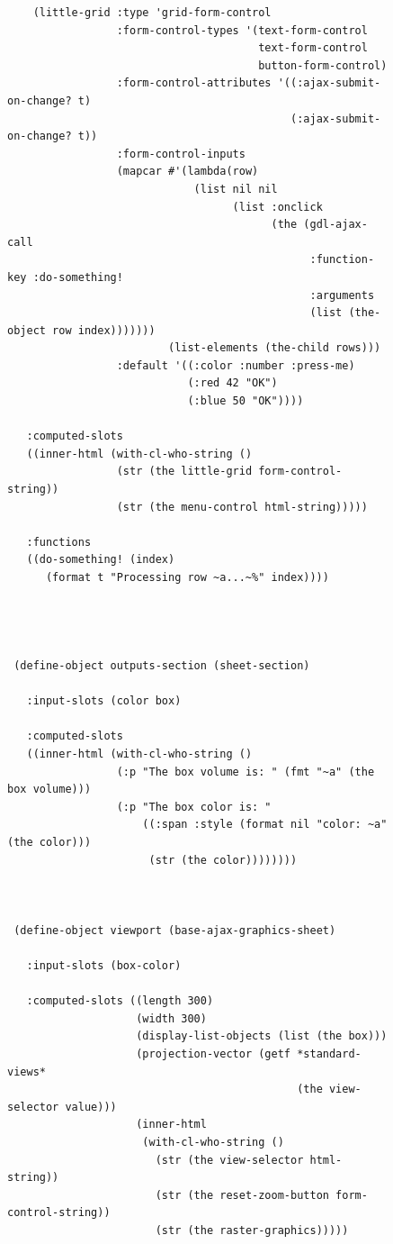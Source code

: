 \documentclass [11pt]{book}
\begin{document}
\begin{itemize}
\begin{figure}
\begin{lrbox}{\boxedverb}
\begin{minipage}{\linewidth}
{\begin{verbatim}
    (little-grid :type 'grid-form-control
                 :form-control-types '(text-form-control 
                                       text-form-control 
                                       button-form-control)
                 :form-control-attributes '((:ajax-submit-on-change? t)
                                            (:ajax-submit-on-change? t))
                 :form-control-inputs 
                 (mapcar #'(lambda(row)
                             (list nil nil 
                                   (list :onclick 
                                         (the (gdl-ajax-call 
                                               :function-key :do-something!
                                               :arguments 
                                               (list (the-object row index)))))))
                         (list-elements (the-child rows)))
                 :default '((:color :number :press-me)
                            (:red 42 "OK")
                            (:blue 50 "OK"))))
   
   :computed-slots 
   ((inner-html (with-cl-who-string ()
                 (str (the little-grid form-control-string))
                 (str (the menu-control html-string)))))
   
   :functions
   ((do-something! (index)
      (format t "Processing row ~a...~%" index))))




 (define-object outputs-section (sheet-section)
   
   :input-slots (color box)
  
   :computed-slots 
   ((inner-html (with-cl-who-string ()
                 (:p "The box volume is: " (fmt "~a" (the box volume)))
                 (:p "The box color is: " 
                     ((:span :style (format nil "color: ~a" (the color)))
                      (str (the color))))))))



 (define-object viewport (base-ajax-graphics-sheet)
  
   :input-slots (box-color)

   :computed-slots ((length 300)
                    (width 300)
                    (display-list-objects (list (the box)))
                    (projection-vector (getf *standard-views* 
                                             (the view-selector value)))
                    (inner-html
                     (with-cl-who-string ()
                       (str (the view-selector html-string))
                       (str (the reset-zoom-button form-control-string))
                       (str (the raster-graphics)))))
  

\end{verbatim}}
\end{minipage}
\end{lrbox}
\end{figure}
\end{itemize}
\end{document}
